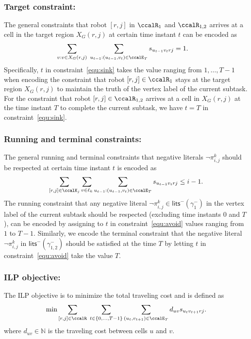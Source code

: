 \documentclass[Afour,sageh,times]{sagej}
\renewcommand{\ap}[3]{\mathcal{\pi}_{{#1},{#2}}^{#3}}
\begin{document}
{{\subsubsection{Target constraint:}
The general constraints that robot $[r,j]$ in $\ccalR_1$ and $\ccalR_{1,2}$  arrives at a cell   in the target region $X_G(r,j)$ at certain time instant $t$ can be encoded as
  \begin{align}\label{equ:sink}
  \sum_{v: v \in X_G(r,j) } \;\sum_{u_{t-1}:(u_{t-1}, v_{t}) \in \ccalE_T} s_{u_{t-1} v_{t} rj} &  = 1.
  \end{align}
 Specifically, $t$ in constraint~\eqref{equ:sink} takes the value ranging from $1, \ldots, T-1$ when encoding the constraint that robot $[r,j] \in\ccalR_1$  stays at the target region $X_G(r,j)$ to maintain the truth of  the vertex label of the current subtask.  For the constraint that robot $[r,j]\in\ccalR_{1,2} $ arrives at a cell in $X_G(r,j)$ at the time instant $T$ to complete the current subtask, we have $t = T$ in constraint~\eqref{equ:sink}. %

 \subsubsection{Running and terminal constraints:} The general running and terminal constraints that negative literals $\neg \ap{i}{j}{k}$ should be respected at certain time instant $t$ is encoded as
\begin{align}\label{equ:avoid}
  \sum_{[r,j]\in \ccalK_j} \sum_{v \in \ell_k}   \sum_{u_{t-1}: (u_{t-1}, v_{t}) \in \ccalE_T} s_{u_{t-1} v_{t} r j } \leq i - 1.
\end{align}
The running constraint that any
negative literal $\neg\ap{i}{j}{k} \in \mathsf{lits}^-(\gamma_1^-)$ in the vertex label of the current subtask should be respected (excluding time instants $0 $ and $T$), can be encoded by assigning to $t$ in constraint~\eqref{equ:avoid} values ranging from $1$ to $T-1$. Similarly, we encode the terminal constraint that the negative literal  $\neg\ap{i}{j}{k}$ in $\mathsf{lits}^-(\gamma_{1,2}^-)$  should be satisfied at the time $T$ by letting $t$ in constraint~\eqref{equ:avoid} take the value $T$.
\subsubsection{ILP objective:} The ILP objective is to minimize the total traveling cost and is defined as
\begin{align}
  \text{min} \sum_{[r,j] \in \ccalR} \; \sum_{t\in \{0,\ldots, T-1\}} \sum_{(u_t, v_{t+1}) \in \ccalE_T} d_{uv} s_{u_{t} v_{t+1} r j}   .
\end{align}
where $d_{uv} \in \mathbb{N}$ is the traveling cost between cells $u$ and $v$.

}}
\end{document}
